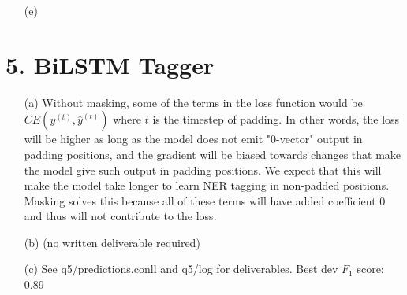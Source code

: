 \documentclass{article}
\begin{document}
\begin{itemize}
    Viterbi decoding output:

    \begin{verbatim}
        Token-level confusion matrix:
go\gu   	PER     	ORG     	LOC     	MISC    	O       
PER     	2779.00 	54.00   	69.00   	22.00   	225.00  
ORG     	109.00  	1615.00 	78.00   	43.00   	247.00  
LOC     	41.00   	100.00  	1730.00 	27.00   	196.00  
MISC    	39.00   	36.00   	25.00   	1009.00 	159.00  
O       	53.00   	90.00   	42.00   	63.00   	42511.00

Token-level scores:
label	acc  	prec 	rec  	f1   
PER  	0.99 	0.92 	0.88 	0.90 
ORG  	0.99 	0.85 	0.77 	0.81 
LOC  	0.99 	0.89 	0.83 	0.86 
MISC 	0.99 	0.87 	0.80 	0.83 
O    	0.98 	0.98 	0.99 	0.99 
micro	0.99 	0.97 	0.97 	0.97 
macro	0.99 	0.90 	0.85 	0.88 
not-O	0.99 	0.89 	0.83 	0.86 

Entity level P/R/F1: 0.87/0.83/0.85

    \end{verbatim}

    \item[(e)] 
\end{itemize}

\section*{5. BiLSTM Tagger}

\begin{itemize}
    \item[(a)] Without masking, some of the terms in the loss function would be $CE(y^{(t)}, \hat{y}^{(t)})$ where $t$ is the timestep of padding. In other words, the loss will be higher as long as the model does not emit "0-vector" output in padding positions, and the gradient will be biased towards changes that make the model give such output in padding positions. We expect that this will make the model take longer to learn NER tagging in non-padded positions. Masking solves this because all of these terms will have added coefficient $0$ and thus will not contribute to the loss.
    \item[(b)] (no written deliverable required)
    \item[(c)] See q5/predictions.conll and q5/log for deliverables. Best dev $F_1$ score: 0.89
\end{itemize}
\end{document}

